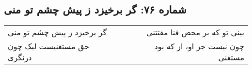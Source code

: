 \begin{center}
\section*{شماره ۷۶: گر برخیزد ز پیش چشم تو منی}
\label{sec:076}
\begin{longtable}{l p{0.5cm} r}
گر برخیزد ز پیش چشم تو منی
&&
بینی تو که بر محض فنا مفتتنی
\\
حق مستغنیست لیک چون درنگری
&&
چون نیست جز او، از که بود مستغنی
\\
\end{longtable}
\end{center}
